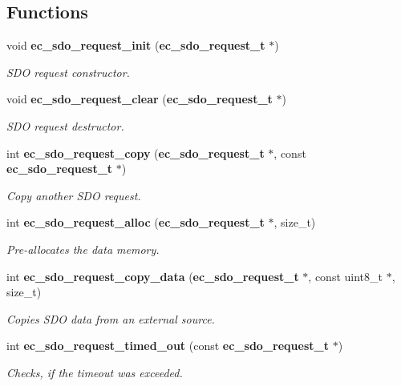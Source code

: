 \subsection*{\-Functions}
\begin{DoxyCompactItemize}
\item 
void {\bf ec\-\_\-sdo\-\_\-request\-\_\-init} ({\bf ec\-\_\-sdo\-\_\-request\-\_\-t} $\ast$)\label{sdo__request_8h_ad8aff35de00f93957ff85baafa8fd4e7}

\begin{DoxyCompactList}\small\item\em \-S\-D\-O request constructor. \end{DoxyCompactList}\item 
void {\bf ec\-\_\-sdo\-\_\-request\-\_\-clear} ({\bf ec\-\_\-sdo\-\_\-request\-\_\-t} $\ast$)\label{sdo__request_8h_a74443922a8e3286319551f013ca4a497}

\begin{DoxyCompactList}\small\item\em \-S\-D\-O request destructor. \end{DoxyCompactList}\item 
int {\bf ec\-\_\-sdo\-\_\-request\-\_\-copy} ({\bf ec\-\_\-sdo\-\_\-request\-\_\-t} $\ast$, const {\bf ec\-\_\-sdo\-\_\-request\-\_\-t} $\ast$)
\begin{DoxyCompactList}\small\item\em \-Copy another \-S\-D\-O request. \end{DoxyCompactList}\item 
int {\bf ec\-\_\-sdo\-\_\-request\-\_\-alloc} ({\bf ec\-\_\-sdo\-\_\-request\-\_\-t} $\ast$, size\-\_\-t)
\begin{DoxyCompactList}\small\item\em \-Pre-\/allocates the data memory. \end{DoxyCompactList}\item 
int {\bf ec\-\_\-sdo\-\_\-request\-\_\-copy\-\_\-data} ({\bf ec\-\_\-sdo\-\_\-request\-\_\-t} $\ast$, const uint8\-\_\-t $\ast$, size\-\_\-t)
\begin{DoxyCompactList}\small\item\em \-Copies \-S\-D\-O data from an external source. \end{DoxyCompactList}\item 
int {\bf ec\-\_\-sdo\-\_\-request\-\_\-timed\-\_\-out} (const {\bf ec\-\_\-sdo\-\_\-request\-\_\-t} $\ast$)
\begin{DoxyCompactList}\small\item\em \-Checks, if the timeout was exceeded. \end{DoxyCompactList}\end{DoxyCompactItemize}


